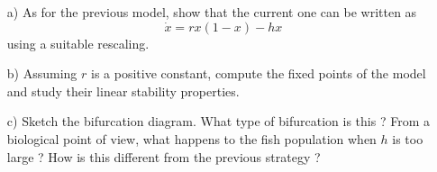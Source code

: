 \begin{problem}
  \begin{enumerate}
  \item[a)] As for the previous model, show that the current one can be written as
    \[
    \dot{x} = r x \left( 1 - x \right) - hx
    \]
    using a suitable rescaling.

  \item[b)] Assuming $r$ is a positive constant, compute the fixed points of the model and study their linear stability properties.

  \item[c)] Sketch the bifurcation diagram.
    What type of bifurcation is this ?
    From a biological point of view, what happens to the fish population when $h$ is too large ?
    How is this different from the previous strategy ?

  \end{enumerate}
\end{problem}
